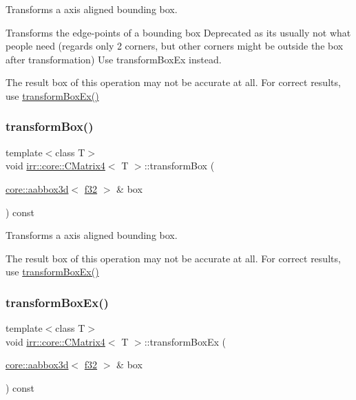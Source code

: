 Transforms a axis aligned bounding box. 

Transforms the edge-\/points of a bounding box Deprecated as it\textquotesingle{}s usually not what people need (regards only 2 corners, but other corners might be outside the box after transformation) Use transform\+Box\+Ex instead.

The result box of this operation may not be accurate at all. For correct results, use \hyperlink{classirr_1_1core_1_1CMatrix4_a2fcdfa14ef16240470e2b46d19a5cb43}{transform\+Box\+Ex()} \mbox{\label{classirr_1_1core_1_1CMatrix4_a4d44428ac5dde99e21f0eb4c50195692}} 
\subsubsection{\texorpdfstring{transform\+Box()}{transformBox()}\hspace{0.1cm}{\footnotesize\ttfamily [2/2]}}
{\footnotesize\ttfamily template$<$class T$>$ \\
void \hyperlink{classirr_1_1core_1_1CMatrix4}{irr\+::core\+::\+C\+Matrix4}$<$ T $>$\+::transform\+Box (\begin{DoxyParamCaption}\item[{\hyperlink{classirr_1_1core_1_1aabbox3d}{core\+::aabbox3d}$<$ \hyperlink{namespaceirr_a0277be98d67dc26ff93b1a6a1d086b07}{f32} $>$ \&}]{box }\end{DoxyParamCaption}) const}



Transforms a axis aligned bounding box. 

The result box of this operation may not be accurate at all. For correct results, use \hyperlink{classirr_1_1core_1_1CMatrix4_a2fcdfa14ef16240470e2b46d19a5cb43}{transform\+Box\+Ex()} \mbox{\label{classirr_1_1core_1_1CMatrix4_a2fcdfa14ef16240470e2b46d19a5cb43}} 
\subsubsection{\texorpdfstring{transform\+Box\+Ex()}{transformBoxEx()}\hspace{0.1cm}{\footnotesize\ttfamily [1/2]}}
{\footnotesize\ttfamily template$<$class T$>$ \\
void \hyperlink{classirr_1_1core_1_1CMatrix4}{irr\+::core\+::\+C\+Matrix4}$<$ T $>$\+::transform\+Box\+Ex (\begin{DoxyParamCaption}\item[{\hyperlink{classirr_1_1core_1_1aabbox3d}{core\+::aabbox3d}$<$ \hyperlink{namespaceirr_a0277be98d67dc26ff93b1a6a1d086b07}{f32} $>$ \&}]{box }\end{DoxyParamCaption}) const}



